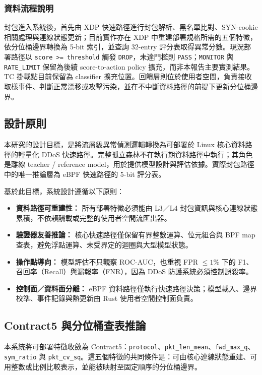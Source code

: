 \documentclass[12pt, a4paper, fontset=none]{ctexart}
\newcommand{\code}[1]{\texttt{#1}}
\begin{document}
\subsubsection{資料流程說明}
封包進入系統後，首先由 XDP 快速路徑進行封包解析、黑名單比對、SYN-cookie 相關處理與連線狀態更新；目前實作亦在 XDP 中重建部署規格所需的五個特徵，依分位桶邊界轉換為 5-bit 索引，並查詢 32-entry 評分表取得異常分數。現況部署路徑以 \code{score >= threshold} 觸發 \code{DROP}，未達門檻則 \code{PASS}；\code{MONITOR} 與 \code{RATE\_LIMIT} 保留為後續 score-to-action policy 擴充，而非本報告主要實測結果。TC 掛載點目前保留為 classifier 擴充位置。回饋層則位於使用者空間，負責接收取樣事件、判斷正常漂移或攻擊污染，並在不中斷資料路徑的前提下更新分位桶邊界。

\subsection{設計原則}
本研究的設計目標，是將流層級異常偵測邏輯轉換為可部署於 Linux 核心資料路徑的輕量化 DDoS 快速路徑。完整孤立森林不在執行期資料路徑中執行；其角色是離線 teacher / reference model，用於提供模型設計與評估依據。實際封包路徑中的唯一推論層為 eBPF 快速路徑的 5-bit 評分表。

基於此目標，系統設計遵循以下原則：

\begin{itemize}
  \item \textbf{資料路徑可重建性：} 所有部署特徵必須能由 L3／L4 封包資訊與核心連線狀態累積，不依賴酬載或完整的使用者空間流匯出器。
  \item \textbf{驗證器友善推論：} 核心快速路徑僅保留有界整數運算、位元組合與 BPF map 查表，避免浮點運算、未受界定的迴圈與大型模型狀態。
  \item \textbf{操作點導向：} 模型評估不只觀察 ROC-AUC，也重視 FPR $\leq 1\%$ 下的 F1、召回率（Recall）與漏報率（FNR），因為 DDoS 防護系統必須控制誤殺率。
  \item \textbf{控制面／資料面分離：} eBPF 資料路徑僅執行快速路徑決策；模型載入、邊界校準、事件記錄與熱更新由 Rust 使用者空間控制面負責。
\end{itemize}

\subsection{Contract5 與分位桶查表推論}
本系統將可部署特徵收斂為 Contract5：\code{protocol}、\code{pkt\_len\_mean}、\code{fwd\_max\_q}、\code{sym\_ratio} 與 \code{pkt\_cv\_sq}。這五個特徵的共同條件是：可由核心連線狀態重建、可用整數或比例比較表示，並能被映射至固定順序的分位桶邊界。
\end{document}
